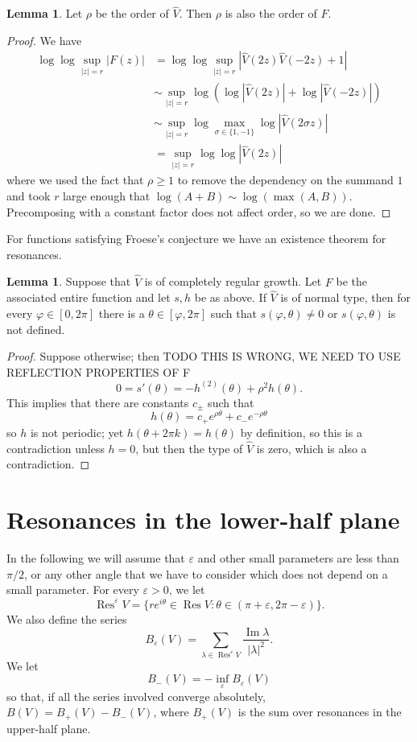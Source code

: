 \documentclass[12pt]{report}
\DeclareMathOperator{\Res}{Res}
\renewcommand{\Im}{\operatorname{Im}}
\theoremstyle{definition}
\newtheorem{lemma}[theorem]{Lemma}
\begin{document}
\begin{lemma}
\label{order of F}
Let $\rho$ be the order of $\hat V$. Then $\rho$ is also the order of $F$.
\end{lemma}
\begin{proof}
We have
\begin{align*}\log \log \sup_{|z| = r} |F(z)| &= \log \log \sup_{|z| = r} |\hat V(2z)\hat V(-2z) + 1| \\
  &\sim \sup_{|z| = r} \log(\log |\hat V(2z)| + \log |\hat V(-2z)|)\\
  &\sim \sup_{|z| = r} \log \max_{\sigma \in \{1,-1\}} \log |\hat V(2\sigma z)|\\
  &= \sup_{|z| = r} \log \log |\hat V(2z)|
\end{align*}
where we used the fact that $\rho \geq 1$ to remove the dependency on the summand $1$ and took $r$ large enough that $\log(A + B) \sim \log(\max(A, B))$. Precomposing with a constant factor does not affect order, so we are done.
\end{proof}

For functions satisfying Froese's conjecture we have an existence theorem for resonances.
\begin{lemma}
\label{existence theorem for resonances}
Suppose that $\hat V$ is of completely regular growth.
Let $F$ be the associated entire function and let $s, h$ be as above.
If $\hat V$ is of normal type, then for every $\varphi \in [0, 2\pi]$ there is a $\theta \in [\varphi, 2\pi]$ such that $s(\varphi, \theta) \neq 0$ or $s(\varphi, \theta)$ is not defined.
\end{lemma}
\begin{proof}
Suppose otherwise; then TODO THIS IS WRONG, WE NEED TO USE REFLECTION PROPERTIES OF F
$$0 = s'(\theta) = -h^{(2)}(\theta) + \rho^2 h(\theta).$$
This implies that there are constants $c_\pm$ such that
$$h(\theta) = c_+e^{\rho \theta} + c_-e^{-\rho\theta}$$
so $h$ is not periodic; yet $h(\theta + 2\pi k) = h(\theta)$ by definition, so this is a contradiction unless $h = 0$, but then the type of $\hat V$ is zero, which is also a contradiction.
\end{proof}



\section{Resonances in the lower-half plane}
In the following we will assume that $\varepsilon$ and other small parameters are less than $\pi/2$, or any other angle that we have to consider which does not depend on a small parameter.
For every $\varepsilon > 0$, we let
$$\Res^\varepsilon V = \{re^{i\theta} \in \Res V: \theta \in (\pi + \varepsilon, 2\pi - \varepsilon)\}.$$
We also define the series
$$B_\varepsilon(V) =\sum_{\lambda \in \Res^\varepsilon V} \frac{\Im \lambda}{|\lambda|^2}.$$
We let
$$B_-(V) = -\inf_\varepsilon B_\varepsilon(V)$$
so that, if all the series involved converge absolutely, $B(V) = B_+(V) - B_-(V)$, where $B_+(V)$ is the sum over resonances in the upper-half plane.
\end{document}
